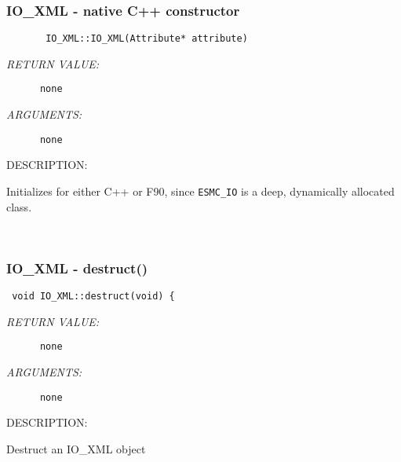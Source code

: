 \subsubsection [IO\_XML] {IO\_XML - native C++ constructor}


  
\begin{verbatim}       IO_XML::IO_XML(Attribute* attribute)\end{verbatim}{\em RETURN VALUE:}
\begin{verbatim}      none\end{verbatim}{\em ARGUMENTS:}
\begin{verbatim}      none\end{verbatim}
{\sf DESCRIPTION:\\ }


        Initializes for either C++ or F90, since {\tt ESMC\_IO} is a deep,
        dynamically allocated class.
   
 
\mbox{}\hrulefill\ 
 
\subsubsection [IO\_XML] {IO\_XML - destruct()}


  
\begin{verbatim} void IO_XML::destruct(void) {\end{verbatim}{\em RETURN VALUE:}
\begin{verbatim}      none\end{verbatim}{\em ARGUMENTS:}
\begin{verbatim}      none\end{verbatim}
{\sf DESCRIPTION:\\ }


        Destruct an IO_XML object
  
\setlength{\parskip}{\oldparskip}
\setlength{\parindent}{\oldparindent}
\setlength{\baselineskip}{\oldbaselineskip}
